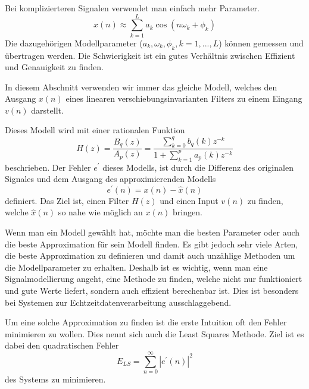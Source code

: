 Bei komplizierteren Signalen verwendet man einfach mehr Parameter.
\begin{equation}
x(n) \approx \sum_{k=1}^{L} a_{k} \cos \left(n \omega_{k}+\phi_{k}\right)
\end{equation}
Die dazugehörigen Modellparameter ($a_k,\omega_{k},\phi_{k},k=1,...,L$) können gemessen und übertragen werden.
Die Schwierigkeit ist ein gutes Verhältnis zwischen Effizient und Genauigkeit zu finden. 

In diesem Abschnitt verwenden wir immer das gleiche Modell, welches den Ausgang $x(n)$ eines linearen verschiebungsinvarianten Filters zu einem Eingang $v(n)$ darstellt.  
\begin{center}
\end{center}
Dieses Modell wird mit einer rationalen Funktion
\begin{equation}
H(z)
=
\frac{B_{q}(z)}{A_{p}(z)}
=
\frac{\displaystyle\sum_{k=0}^{q} b_{q}(k) z^{-k}}{1+\displaystyle\sum_{k=1}^{p} a_{p}(k) z^{-k}}
\label{pade:uebertragungsfunktion}
\end{equation}
beschrieben.
Der Fehler $e^{\prime}$ dieses Modells, ist durch die Differenz des originalen Signales und dem Ausgang des approximierenden Modells
\begin{equation}
e^{\prime}(n)=x(n)-\hat{x}(n)
\end{equation}
definiert. 
Das Ziel ist, einen Filter $H(z)$ und einen Input $v(n)$ zu finden, welche
$\hat{x}(n)$ so nahe wie möglich an $x(n)$ bringen.

Wenn man ein Modell gewählt hat, möchte man die besten Parameter oder auch die beste Approximation für sein Modell finden.
Es gibt jedoch sehr viele Arten, die beste Approximation zu definieren und damit auch unzählige Methoden um die Modellparameter zu erhalten.
Deshalb ist es wichtig, wenn man eine Signalmodellierung angeht,
eine Methode zu finden, welche nicht nur funktioniert und gute Werte
liefert, sondern auch effizient berechenbar ist.
Dies ist besonders bei Systemen zur Echtzeitdatenverarbeitung ausschlaggebend.
%

Um eine solche Approximation zu finden ist die erste Intuition oft den Fehler minimieren zu wollen.
Dies nennt sich auch die Least Squares Methode.
%
Ziel ist es dabei den quadratischen Fehler 
%
\begin{equation}
E_{L S}
=
\sum_{n=0}^{\infty}\left|e^{\prime}(n)\right|^{2}
\end{equation}
des Systems zu minimieren.

